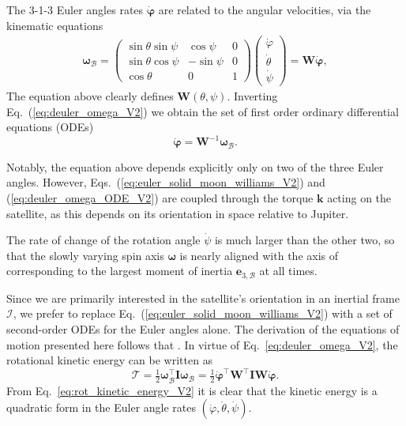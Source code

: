 \documentclass[lineno, pdflatex,sn-mathphys-ay]{sn-jnl}
\theoremstyle{thmstyleone}%
\theoremstyle{thmstyletwo}%
\theoremstyle{thmstylethree}%
\renewcommand{\vec}[1]{\boldsymbol{#1}}
\begin{document}
The 3-1-3 Euler angles rates $\dot{\vec{\varphi}}$ are related to the angular velocities, via the kinematic equations 
 \begin{align} \label{eq:deuler_omega_V2}
	\vec{\omega}_{\mathcal{B}} = 
	\begin{pmatrix}
			\sin\theta \sin\psi  & \cos\psi & 0 \\
			\sin\theta \cos\psi &-\sin\psi & 0 \\
			\cos\theta & 0 &1 
	\end{pmatrix}
	\begin{pmatrix}
		\dot{\varphi} \\
		\dot{\theta} \\
		\dot{\psi}
	\end{pmatrix}
	= \vec{W}\dot{\vec{\varphi}},
\end{align}
%
The equation above clearly defines $\vec{W}(\theta,\psi)$.
Inverting Eq.~(\ref{eq:deuler_omega_V2}) we obtain the set of
first order ordinary differential equations (ODEs)
\begin{equation}\label{eq:deuler_omega_ODE_V2}
	\dot{\vec{\varphi}} = \vec{W}^{-1}\vec{\omega}_{\mathcal{B}}.
\end{equation} 


Notably, the equation above depends explicitly only on two of the three Euler angles.
However, Eqs.~(\ref{eq:euler_solid_moon_williams_V2}) and (\ref{eq:deuler_omega_ODE_V2}) are coupled through the torque $\vec{k}$ acting on the satellite, as this depends on its orientation in space relative to Jupiter.


The rate of change of the rotation angle $\dot{\psi}$ is much larger than the other two, so that the slowly varying spin axis $\vec{\omega}$ is nearly aligned with the axis of corresponding to the largest moment of inertia $\vec{e}_{3,\mathcal{B}}$ at all times. 


Since we are primarily interested in the satellite's orientation in an inertial frame  $\mathcal{I}$, we prefer to replace Eq.~(\ref{eq:euler_solid_moon_williams_V2}) with a set of second-order ODEs for the Euler angles alone. The derivation of the equations of motion presented here follows that \citet{Broucke1990doi:10.2514/3.20591}.
In virtue of Eq.~\eqref{eq:deuler_omega_V2}, the rotational kinetic energy can be written as
\begin{equation}\label{eq:rot_kinetic_energy_V2}
	\mathcal{T}  = 
	\tfrac{1}{2} \vec{\omega}_{\mathcal{B}}^\top \vec{I} \vec{\omega}_{\mathcal{B}} 
	= \tfrac{1}{2} \dot{\vec{\varphi}}^\top\vec{W}^\top \vec{I} \vec{W}\dot{\vec{\varphi}}.
\end{equation}
From Eq.~\eqref{eq:rot_kinetic_energy_V2} it is clear that the kinetic energy is a quadratic form in the Euler angle rates
${(\dot{\varphi},\dot{\theta},\dot{\psi})}$.
\end{document}
